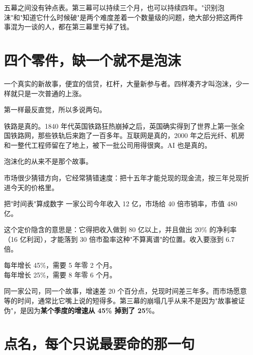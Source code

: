 \begin{chainflow}
\chainarrow {}\chainarrow {}\chainarrow {}\chainarrow {}
\end{chainflow}

五幕之间没有钟点表。第三幕可以持续三个月，也可以持续四年。"识别泡沫"和"知道它什么时候破"是两个难度差着一个数量级的问题，绝大部分把这两件事混为一谈的人，都在第三幕里亏掉了钱。

\section{四个零件，缺一个就不是泡沫}

一个真实的新故事，便宜的信贷，杠杆，大量新参与者。四样凑齐才叫泡沫，少一样就只是一次普通的上涨。

第一样最反直觉，所以多说两句。

铁路是真的。1840 年代英国铁路狂热崩掉之后，英国确实得到了世界上第一张全国铁路网，那些铁轨后来跑了一百多年。互联网是真的，2000 年之后光纤、机房和一整代工程师留在了地上，被下一批公司用得很爽。AI 也是真的。

泡沫化的从来不是那个故事。

\begin{pullquote}{}
市场很少猜错方向，它经常猜错速度：把十五年才能兑现的现金流，按三年兑现折进今天的价格里。
\end{pullquote}

\begin{egbox}{把"时间表"算成数字}
一家公司今年收入 12 亿，市场给 40 倍市销率，市值 480 亿。

这个定价隐含的意思是：它得把收入做到 80 亿以上，并且做出 20\% 的净利率（16 亿利润），才能落到 30 倍市盈率这种"不算离谱"的位置。收入要涨到 6.7 倍。

每年增长 45\%，需要 5 年零 2 个月。\\ 每年增长 25\%，需要 8 年零 6 个月。

同一家公司，同一个故事，增速差 20 个百分点，兑现时间差三年多。而市场愿意等的时间，通常比它嘴上说的短得多。第三幕的崩塌几乎从来不是因为"故事被证伪"，是因为\textbf{某个季度的增速从 45\% 掉到了 25\%}。

\end{egbox}

\section{点名，每个只说最要命的那一句}

